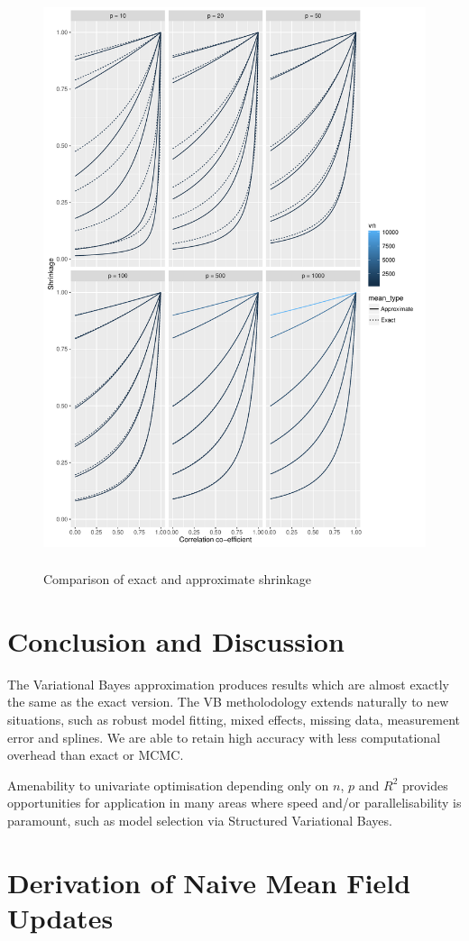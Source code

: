 \documentclass{amsart}[12pt]
\begin{document}
\begin{figure}[p]
	\caption{Comparison of exact and approximate shrinkage}
	\label{fig:shrinkage}
	\includegraphics[width=17cm, height=17cm]{Chapter_3_shrinkage.pdf}
\end{figure}

\section{Conclusion and Discussion}
\label{sec:conclusion}

The Variational Bayes approximation produces results which are almost exactly the same as the exact version.
The VB metholodology extends naturally to new situations, such as robust model fitting, mixed effects, missing
data, measurement error and splines. We are able to retain high accuracy with less computational overhead than
exact or MCMC.

Amenability to univariate optimisation depending only on $n$, $p$ and $R^2$ provides opportunities for
application in many areas where speed and/or parallelisability is paramount, such as model selection via
Structured Variational Bayes.




\appendix
\section{Derivation of Naive Mean Field Updates}
\label{sec:appendix}
\end{document}
